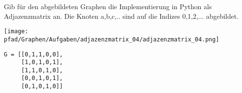 ﻿\question[3]
Gib für den abgebildeten Graphen die Implementierung in Python als Adjazenzmatrix an.
Die Knoten a,b,c,.. sind auf die Indizes 0,1,2,... abgebildet.

\texttt{[image: \\pfad/Graphen/Aufgaben/adjazenzmatrix\_04/adjazenzmatrix\_04.png]}
\begin{solutionbox}{5cm}
\begin{lstlisting}
G = [[0,1,1,0,0],
     [1,0,1,0,1],
     [1,1,0,1,0],
     [0,0,1,0,1],
     [0,1,0,1,0]]

\end{lstlisting}
\end{solutionbox}
